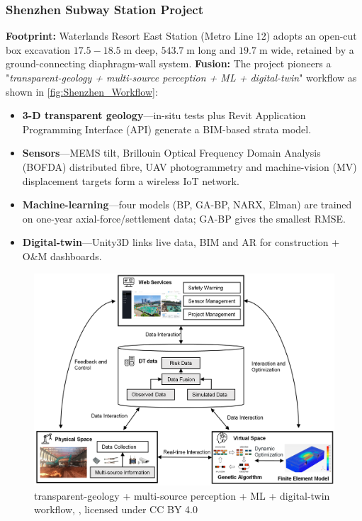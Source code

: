 \documentclass[preprint,11pt,authoryear,3p]{elsarticle}
\begin{document}
\subsubsection{Shenzhen Subway Station Project}
\label{subsec:shenzhen_case}

\textbf{Footprint:} Waterlands Resort East Station (Metro Line 12) adopts an open-cut box excavation \(17.5\!-\!18.5\;\mathrm{m}\) deep, \(543.7\;\mathrm{m}\) long and \(19.7\;\mathrm{m}\) wide, retained by a ground-connecting diaphragm-wall system. \textbf{Fusion:} The project pioneers a "\textit{transparent-geology + multi-source perception + ML + digital-twin}" workflow as shown in \autoref{fig:Shenzhen_Workflow}:

\begin{itemize}
  \item \textbf{3-D transparent geology}—in-situ tests plus Revit Application Programming Interface (API)
        generate a BIM-based strata model.
  \item \textbf{Sensors}—MEMS tilt, Brillouin Optical Frequency Domain Analysis (BOFDA) distributed fibre, UAV
        photogrammetry and machine-vision (MV) displacement targets
        form a wireless IoT network.
  \item \textbf{Machine-learning}—four models (BP, GA-BP, NARX, Elman)
        are trained on one-year axial-force/settlement data; GA-BP gives the
        smallest RMSE.
  \item \textbf{Digital-twin}—Unity3D links live data, BIM and AR for
        construction + O\&M dashboards.
\end{itemize}

\begin{figure}
  \centering
  \includegraphics[width=\textwidth]{imgs/Shenzhen_Workflow.png}
  \caption{transparent-geology + multi-source perception + ML + digital-twin workflow, \citep{AnIntegratedIntelligent}, licensed under CC BY 4.0}
  \label{fig:Shenzhen_Workflow}
\end{figure}
\end{document}
